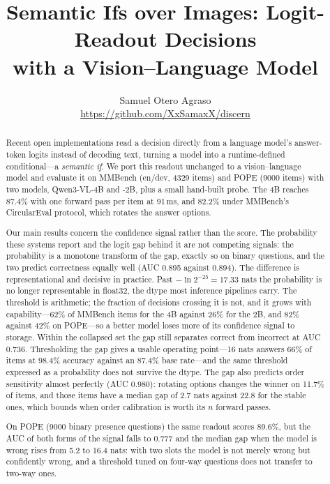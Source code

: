 \documentclass[10pt,twocolumn]{article}
\title{\vspace{-1.2cm}\bfseries Semantic Ifs over Images: Logit-Readout Decisions\\
with a Vision--Language Model}
\author{%
Samuel Otero Agraso\\
\small\url{https://github.com/XxSamaxX/discern}
}
\date{}
\begin{document}
\maketitle

\begin{abstract}
\noindent
Recent open implementations read a decision directly from a language model's
answer-token logits instead of decoding text, turning a model into a
runtime-defined conditional---a \emph{semantic if}. We port this readout
unchanged to a vision--language model and evaluate it on MMBench
(en/dev, 4329 items) and POPE (9000 items) with two models, Qwen3-VL-4B and
-2B, plus a small hand-built probe. The 4B reaches 87.4\% with one forward pass
per item at 91\,ms, and 82.2\% under MMBench's CircularEval protocol, which
rotates the answer options.

Our main results concern the confidence signal rather than the score. The
probability these systems report and the logit gap behind it are not
competing signals: the probability is a monotone transform of the gap, exactly
so on binary questions, and the two predict correctness equally well (AUC 0.895
against 0.894). The difference is representational and decisive in practice.
Past $-\ln 2^{-25} = 17.33$ nats the probability is no longer representable in
float32, the dtype most inference pipelines carry. The threshold is arithmetic;
the fraction of decisions crossing it is not, and it grows with capability---62\%
of MMBench items for the 4B against 26\% for the 2B, and 82\% against 42\% on
POPE---so a better model loses more of its confidence signal to storage. Within
the collapsed set the gap still separates correct from incorrect at AUC 0.736. Thresholding the
gap gives a usable operating point---16 nats answers 66\% of items at 98.4\%
accuracy against an 87.4\% base rate---and the same threshold expressed as a
probability does not survive the dtype. The gap also predicts order sensitivity
almost perfectly (AUC 0.980):
rotating options changes the winner on 11.7\% of items, and those items have a
median gap of 2.7 nats against 22.8 for the stable ones, which bounds when
order calibration is worth its $n$ forward passes.

On POPE (9000 binary presence questions) the same readout scores 89.6\%, but
the AUC of both forms of the signal falls to 0.777 and the median gap when the
model is wrong rises from 5.2 to 16.4 nats: with two slots the model is not
merely wrong but confidently wrong, and a threshold tuned on four-way questions
does not transfer to two-way ones.


\end{abstract}
\end{document}
